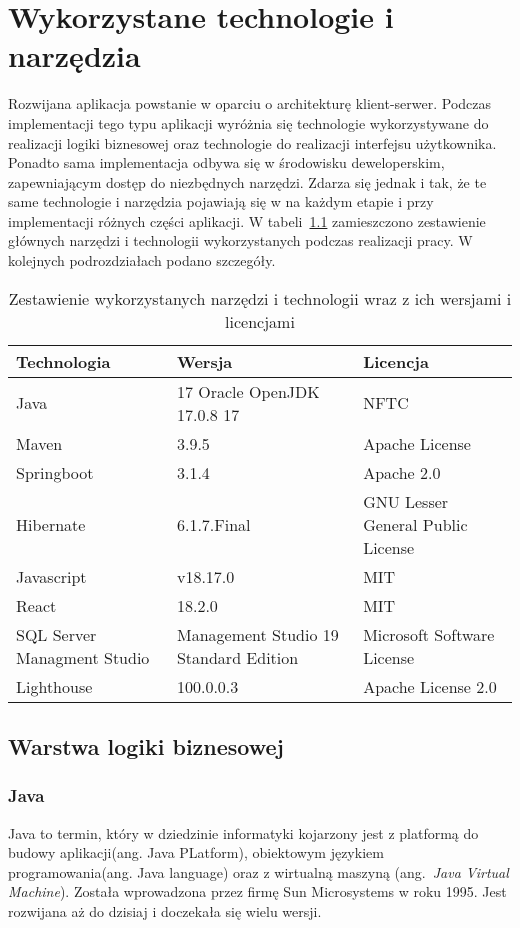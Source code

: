 \chapter{Wykorzystane technologie i narzędzia}
Rozwijana aplikacja powstanie w oparciu o architekturę klient-serwer. Podczas implementacji tego typu aplikacji wyróżnia się technologie wykorzystywane do realizacji logiki biznesowej oraz technologie do realizacji interfejsu użytkownika. Ponadto sama implementacja odbywa się w środowisku deweloperskim, zapewniającym dostęp do niezbędnych narzędzi. Zdarza się jednak i tak, że te same technologie i narzędzia pojawiają się w na każdym etapie i przy implementacji różnych części aplikacji.
W tabeli~\ref{tab:zestawienie_narzędzi} zamieszczono zestawienie głównych narzędzi i technologii wykorzystanych podczas realizacji pracy.
W kolejnych podrozdziałach podano szczegóły.


\begin{table}[htb] \small
	\centering
\caption{Zestawienie wykorzystanych narzędzi i technologii wraz z ich wersjami i licencjami}
\label{tab:zestawienie_narzędzi}
\begin{tabularx}{\linewidth}{|X|X|X|}
    \hline
    Technologia & Wersja & Licencja \\
    \hline \hline
    Java & 17 Oracle OpenJDK 17.0.8 17 &  NFTC\\
    \hline
    Maven & 3.9.5 & Apache License\\
    \hline
    Springboot & 3.1.4 & Apache 2.0\\
    \hline
    Hibernate & 6.1.7.Final & GNU Lesser General Public License \\
    \hline
		Javascript & v18.17.0 & MIT \\
    \hline
		React & 18.2.0 & MIT \\
    \hline
		SQL Server Managment Studio & Management Studio 19 Standard Edition & Microsoft Software License\\
		 \hline
		Lighthouse & 100.0.0.3 & Apache License 2.0\\

    \hline
\end{tabularx}
\end{table}

\section{Warstwa logiki biznesowej}
\subsection{Java}
Java to termin, który w dziedzinie informatyki kojarzony jest z platformą do budowy aplikacji(ang. Java PLatform), obiektowym językiem programowania(ang. Java language) oraz z wirtualną maszyną (ang.~\emph{Java Virtual Machine}). Została wprowadzona przez firmę Sun Microsystems w roku 1995. Jest rozwijana aż do dzisiaj i doczekała się wielu wersji. 

